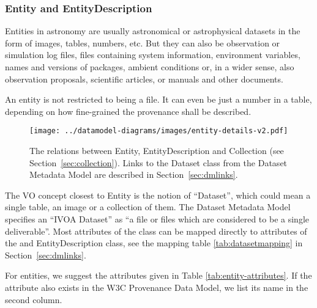 \subsubsection{Entity and EntityDescription}

Entities in astronomy are usually astronomical or astrophysical datasets in the 
form of images, tables, numbers, etc. But they can also be observation or 
simulation log files, files containing system information, environment variables, names and versions of packages, ambient conditions or, in a wider sense, also observation proposals, scientific 
articles, or manuals and other documents. 

An entity is not restricted to being a file. 
It can even be just a number in a table, depending on how fine-grained the 
provenance shall be described.

\begin{figure}[h]
\centering
\texttt{[image: ../datamodel-diagrams/images/entity-details-v2.pdf]}
\caption[Relations between Entity, EntityDescription and Collection]{The relations between Entity, EntityDescription and Collection (see Section~\ref{sec:collection}). 
Links to the Dataset class from the Dataset Metadata Model are described in Section~\ref{sec:dmlinks}.}
\label{fig:entity-details}
\end{figure}

The VO concept closest to Entity is the notion of ``Dataset'', which could mean a single 
table, an image or a collection of them. The Dataset Metadata Model 
\citep{std:DatasetDM} specifies an ``IVOA Dataset'' as ``a file or files which 
are considered to be a single deliverable''. 
Most attributes of the  class can be mapped
directly to attributes of the  and EntityDescription class, see the mapping table \ref{tab:datasetmapping} in Section~\ref{sec:dmlinks}.


For entities, we suggest the attributes given in Table 
\ref{tab:entity-attributes}. If the attribute also exists in the W3C 
Provenance Data Model, we list its name in the second column.



